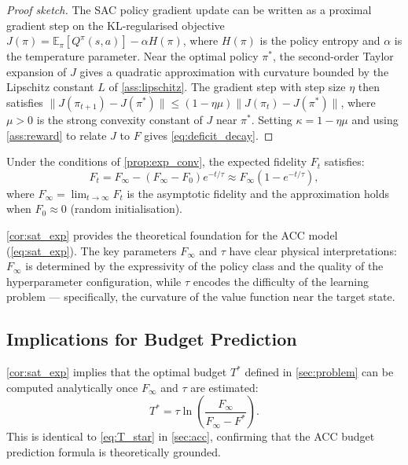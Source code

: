 \begin{proof}[Proof sketch]
The SAC policy gradient update can be written as a proximal gradient step on
the KL-regularised objective $J(\pi) = \mathbb{E}_\pi[Q^\pi(s,a)] - \alpha H(\pi)$,
where $H(\pi)$ is the policy entropy and $\alpha$ is the temperature parameter.
Near the optimal policy $\pi^*$, the second-order Taylor expansion of $J$ gives
a quadratic approximation with curvature bounded by the Lipschitz constant $L$
of \cref{ass:lipschitz}. The gradient step with step size $\eta$ then satisfies
$\|J(\pi_{t+1}) - J(\pi^*)\| \leq (1 - \eta \mu) \|J(\pi_t) - J(\pi^*)\|$,
where $\mu > 0$ is the strong convexity constant of $J$ near $\pi^*$. Setting
$\kappa = 1 - \eta\mu$ and using \cref{ass:reward} to relate $J$ to $F$ gives
\cref{eq:deficit_decay}.
\end{proof}

\begin{corollary}
\label{cor:sat_exp}
Under the conditions of \cref{prop:exp_conv}, the expected fidelity $F_t$ satisfies:
\begin{equation}
  F_t = F_\infty - (F_\infty - F_0) e^{-t/\tau} \approx F_\infty(1 - e^{-t/\tau}),
\end{equation}
where $F_\infty = \lim_{t\to\infty} F_t$ is the asymptotic fidelity and the
approximation holds when $F_0 \approx 0$ (random initialisation).
\end{corollary}

\cref{cor:sat_exp} provides the theoretical foundation for the ACC model
(\cref{eq:sat_exp}). The key parameters $F_\infty$ and $\tau$ have clear
physical interpretations: $F_\infty$ is determined by the expressivity of the
policy class and the quality of the hyperparameter configuration, while $\tau$
encodes the difficulty of the learning problem — specifically, the curvature of
the value function near the target state.

\subsection{Implications for Budget Prediction}

\cref{cor:sat_exp} implies that the optimal budget $T^*$ defined in
\cref{sec:problem} can be computed analytically once $F_\infty$ and $\tau$ are
estimated:
\begin{equation}
  T^* = \tau \ln\!\left(\frac{F_\infty}{F_\infty - F^*}\right).
  \label{eq:T_star_theory}
\end{equation}
This is identical to \cref{eq:T_star} in \cref{sec:acc}, confirming that the
ACC budget prediction formula is theoretically grounded.

